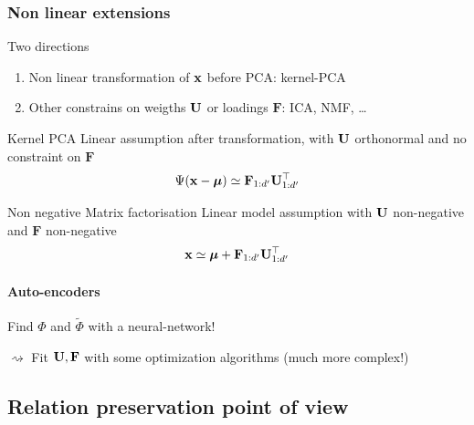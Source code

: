 \documentclass{beamer}\usepackage[]{graphicx}\usepackage[]{color}
\begin{document}
\begin{frame}
  \frametitle{Non linear extensions}

  Two directions
  \begin{enumerate}
    \item Non linear transformation of $\mathbf{x}$ before PCA: kernel-PCA
    \item Other constrains on weigths $\mathbf{U}$ or loadings $\mathbf{F}$: ICA, NMF, \dots
  \end{enumerate}

  \begin{block}{Kernel PCA}
    Linear assumption after transformation, with $\mathbf{U}$ orthonormal and no  constraint on $\mathbf{F}$
    \begin{equation*}
        \Psi(\mathbf{x} - \boldsymbol{\mu}) \simeq  \mathbf{F}_{1:d'} \mathbf{U}_{1:d'}^\top
      \end{equation*}
   \end{block}

  \vfill

  \begin{block}{Non negative Matrix factorisation}
    Linear model assumption  with $\mathbf{U}$ non-negative and  $\mathbf{F}$ non-negative
    \begin{equation*}
        \mathbf{x} \simeq \boldsymbol{\mu} + \mathbf{F}_{1:d'} \mathbf{U}_{1:d'}^\top
      \end{equation*}
  \end{block}
  
  \vfill

  \paragraph{Auto-encoders} Find $\Phi$ and $\tilde\Phi$ with a neural-network!

  $\rightsquigarrow$ Fit $\mathbf{U}, \mathbf{F}$ with some optimization algorithms (much more complex!)
\end{frame}


\subsection{Relation preservation point of view}
\end{document}
